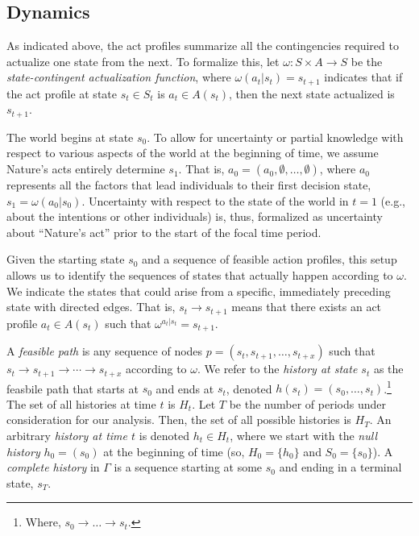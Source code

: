 \documentclass[
11pt,
titlepage,
reqno,
]{article}%
\theoremstyle{definition}
\begin{document}
	\subsection{Dynamics  } 
	  
	As indicated above, the act profiles summarize all the contingencies required to actualize one state from the next. 
	To formalize this, let $\omega:S\times A\rightarrow S$ be the \textit{state-contingent actualization function}, where $\omega(a_t|s_t)=s_{t+1}$ indicates that if the act profile at state $s_t\in S_{t}$ is $a_t\in A(s_t)$, then the next state actualized is $s_{t+1}$.

	The world begins at state $s_0$.
	To allow for uncertainty or partial knowledge with respect to various aspects of the world at the beginning of time, we assume Nature's acts entirely determine $s_{1}$. 
	That is, $a_{0}=(a_0,\emptyset,\ldots,\emptyset)$, where $a_0$ represents all the factors that lead individuals to their  first decision state, $s_1=\omega(a_0|s_0)$.
	Uncertainty with respect to the state of the world in $t=1$ (e.g., about the intentions or other individuals) is, thus, formalized as uncertainty about ``Nature's act'' prior to the start of the focal time period.
	
	Given the starting state $s_0$ and a sequence of feasible action profiles, this setup allows us to identify the sequences of states that  actually happen according to $\omega$. 
	We indicate the states that could arise from a specific, immediately preceding state with directed edges.
	That is, $s_t\rightarrow s_{t+1}$ means that there exists an act profile $a_t\in A(s_t)$ such that $\omega^{a_t|s_t}=s_{t+1}$. 
	
	A \textit{feasible path} is any sequence of nodes $p=(s_t,s_{t+1},\ldots,s_{t+x})$ such that $s_t\rightarrow s_{t+1}\rightarrow \cdots\rightarrow s_{t+x}$ according to $\omega$. 
	We refer to the \textit{history at state $s_t$} as the feasbile path that starts at $s_0$ and ends at $s_t$, denoted $h(s_t)=(s_0,\ldots,s_t)$.\footnote
	{
		Where, $s_0\rightarrow\ldots\rightarrow s_t$.
	}
	The set of all histories at time $t$ is $H_t$.
	Let $T$ be the number of periods under consideration for our analysis.
	Then,  the set of all possible histories is $H_T$.
	An arbitrary \textit{history at time $t$} is denoted $h_t\in H_t$, where we start with the \textit{null history} $h_0=(s_0)$ at the beginning of time (so, $H_0=\{h_0\}$ and  $S_0=\{s_0\}$). 
	A \textit{complete history} in $\Gamma$ is a sequence starting at some $s_0$ and ending in a terminal state, $s_T$.
	
\end{document}
